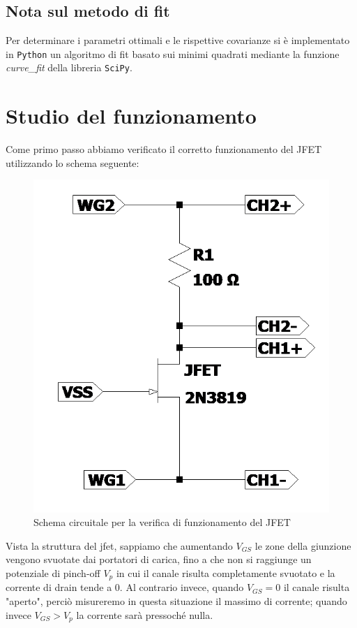\documentclass[10pt, a4paper, italian]{article}
\begin{document}
\subsection*{Nota sul metodo di fit}
Per determinare i parametri ottimali e le rispettive covarianze si \`e
implementato in \verb+Python+ un algoritmo di fit basato sui minimi quadrati
mediante la funzione \emph{curve\_fit} della libreria \texttt{SciPy}.

\section{Studio del funzionamento}
Come primo passo abbiamo verificato il corretto funzionamento del JFET utilizzando lo schema seguente:
\begin{figure}[H]
    \centering
	\includegraphics[scale=0.5]{Draft1}
    \caption{Schema circuitale per la verifica di funzionamento del JFET}
\end{figure}
Vista la struttura del jfet, sappiamo che aumentando $V_{GS}$ le zone della giunzione vengono svuotate dai portatori di carica, fino a che non si raggiunge un potenziale di pinch-off $V_p$ in cui il canale risulta completamente svuotato e la corrente di drain tende a 0. Al contrario invece, quando $V_{GS}=0$ il canale risulta "aperto", perciò misureremo in questa situazione il massimo di corrente; quando invece $V_{GS}>V_p$ la corrente sarà pressoché nulla.
\end{document}
